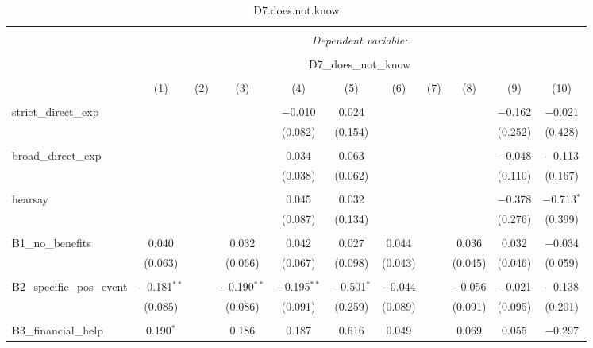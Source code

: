 
\begin{table}[H] \centering 
  \caption{D7.does.not.know} 
  \label{} 
\tiny 
\begin{tabular}{@{\extracolsep{4pt}}lcccccccccc} 
\\[-1.8ex]\hline 
\hline \\[-1.8ex] 
 & \multicolumn{10}{c}{\textit{Dependent variable:}} \\ 
\cline{2-11} 
\\[-1.8ex] & \multicolumn{10}{c}{D7\_does\_not\_know} \\ 
\\[-1.8ex] & (1) & (2) & (3) & (4) & (5) & (6) & (7) & (8) & (9) & (10)\\ 
\hline \\[-1.8ex] 
 strict\_direct\_exp &  &  &  & $-$0.010 & 0.024 &  &  &  & $-$0.162 & $-$0.021 \\ 
  &  &  &  & (0.082) & (0.154) &  &  &  & (0.252) & (0.428) \\ 
  & & & & & & & & & & \\ 
 broad\_direct\_exp &  &  &  & 0.034 & 0.063 &  &  &  & $-$0.048 & $-$0.113 \\ 
  &  &  &  & (0.038) & (0.062) &  &  &  & (0.110) & (0.167) \\ 
  & & & & & & & & & & \\ 
 hearsay &  &  &  & 0.045 & 0.032 &  &  &  & $-$0.378 & $-$0.713$^{*}$ \\ 
  &  &  &  & (0.087) & (0.134) &  &  &  & (0.276) & (0.399) \\ 
  & & & & & & & & & & \\ 
 B1\_no\_benefits & 0.040 &  & 0.032 & 0.042 & 0.027 & 0.044 &  & 0.036 & 0.032 & $-$0.034 \\ 
  & (0.063) &  & (0.066) & (0.067) & (0.098) & (0.043) &  & (0.045) & (0.046) & (0.059) \\ 
  & & & & & & & & & & \\ 
 B2\_specific\_pos\_event & $-$0.181$^{**}$ &  & $-$0.190$^{**}$ & $-$0.195$^{**}$ & $-$0.501$^{*}$ & $-$0.044 &  & $-$0.056 & $-$0.021 & $-$0.138 \\ 
  & (0.085) &  & (0.086) & (0.091) & (0.259) & (0.089) &  & (0.091) & (0.095) & (0.201) \\ 
  & & & & & & & & & & \\ 
 B3\_financial\_help & 0.190$^{*}$ &  & 0.186 & 0.187 & 0.616 & 0.049 &  & 0.069 & 0.055 & $-$0.297 \\ 

\end{tabular}
\end{table}
